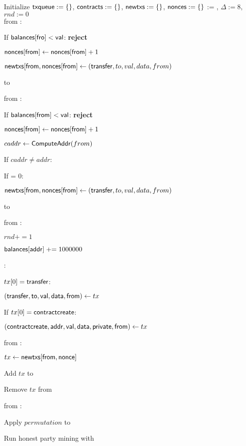 \begin{bbox}[title=$\globalf{G}_{\msf{ledger}}$]

Initialize ${\mathsf {txqueue}} := \{\}$, ${\mathsf {contracts}} := \{\}$, ${\mathsf {newtxs}} := \{\}$, ${\mathsf {nonces}} := \{\}$  := \edict, $\Delta := 8$, $rnd := 0$\\

\OnInput \transfermsg from \Partyi:

	\quad If ${\mathsf {balances[fro]}} < {\mathsf {val}}$: {\bf reject}

	\quad ${\mathsf {nonces[from]}} \leftarrow {\mathsf {nonces[from]}} + 1$

	\quad $\msf{newtxs[from,nonces[from]} \lar \transfermsg$
	
	 \transfermsg to \Adv

\OnInput \createmsg from \Partyi:

	\quad If ${\mathsf {balances[from]}} < {\mathsf {val}}$: {\bf reject}
	
	\quad ${\mathsf {nonces[from]}} \leftarrow {\mathsf {nonces[from]}} + 1$

	\quad $caddr \leftarrow {\mathsf {ComputeAddr}}(from)$
	
	\quad If $caddr \neq addr$: \reject

	\quad If  = 0: \reject

	\quad $\msf{newtxs[from,nonces[from]} \lar \transfermsg$

	 \createmsg to \Adv

\OnInput {} from \Partyi:

	\quad $rnd += 1$

	\quad ${\mathsf {balances[addr]}} \mathrel{+}= 1000000$

	\quad \For {} \In {}: 

		\qquad \If $tx[0] = {\mathsf {transfer}}$:
			
			\qqquad $({\mathsf {transfer, to, val, data, from}}) \leftarrow tx$

			\qqquad {}

		\qquad If $tx[0] = {\mathsf {contractcreate}}$:

			\qqquad $({\mathsf {contractcreate, addr, val, data, private, from}}) \leftarrow tx$
	
			\qqquad {}

\hrulefill

\OnAdvInput {} from \Adv:

	\quad $tx \leftarrow {\mathsf {newtxs[from,nonce]}}$

	\quad Add $tx$ to 

	\quad Remove $tx$ from 

\OnAdvInput {} from \Adv:
	
	\quad Apply $permutation$ to 

	\quad Run honest party mining with 

\end{bbox}
